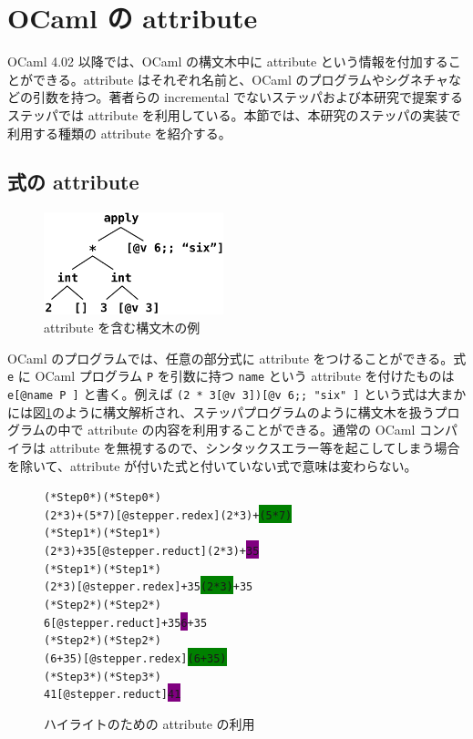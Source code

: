 \section{OCaml の attribute}
\label{OCamlのattribute}
OCaml 4.02 以降では、OCaml の構文木中に attribute という情報を付加することができる。attribute はそれぞれ名前と、OCaml のプログラムやシグネチャなどの引数を持つ。著者らの incremental でないステッパ\cite{FSA18}および本研究で提案するステッパでは attribute を利用している。本節では、本研究のステッパの実装で利用する種類の attribute を紹介する。

\subsection{式の attribute}
\label{OCamlのattribute-式のattribute}

\begin{figure}
  \begin{center}
    \includegraphics[width=5.2cm, height=3cm]{attribute.png}
  \end{center}
  \caption{attribute を含む構文木の例}
  \label{figure:attribute}
\end{figure}

OCaml のプログラムでは、任意の部分式に attribute をつけることができる。式 \texttt{e} に OCaml プログラム \texttt{P} を引数に持つ \texttt{name} という attribute を付けたものは \texttt{e[@name P ]} と書く。例えば \texttt{(2 * 3[@v 3])[@v 6;; "six" ]} という式は大まかには図\ref{figure:attribute}のように構文解析され、ステッパプログラムのように構文木を扱うプログラムの中で attribute の内容を利用することができる。通常の OCaml コンパイラは attribute を無視するので、シンタックスエラー等を起こしてしまう場合を除いて、attribute が付いた式と付いていない式で意味は変わらない。

\begin{figure}
\begin{alltt}
  (* Step 0 *)                              (* Step 0 *)
  (2 * 3) + (5 * 7)[@stepper.redex ]        (2 * 3) + \colorbox{green}{(5 * 7)}
  (* Step 1 *)                              (* Step 1 *)
  (2 * 3) + 35[@stepper.reduct ]            (2 * 3) + \colorbox{purple}{35}
  (* Step 1 *)                              (* Step 1 *)
  (2 * 3)[@stepper.redex ] + 35             \colorbox{green}{(2 * 3)} + 35
  (* Step 2 *)                              (* Step 2 *)
  6[@stepper.reduct ] + 35                  \colorbox{purple}{6} + 35
  (* Step 2 *)                              (* Step 2 *)
  (6 + 35)[@stepper.redex ]                 \colorbox{green}{(6 + 35)}
  (* Step 3 *)                              (* Step 3 *)
  41[@stepper.reduct ]                      \colorbox{purple}{41}
\end{alltt}
\caption{ハイライトのための attribute の利用}
\label{figure:highlight}
\end{figure}


